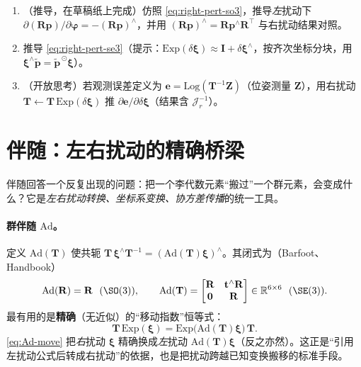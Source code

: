 \begin{practice}
\begin{enumerate}
  \item （推导，在草稿纸上完成）仿照 \cref{eq:right-pert-so3}，推导\emph{左}扰动下 $\partial(\mathbf{R}\mathbf{p})/\partial\boldsymbol{\varphi}=-(\mathbf{R}\mathbf{p})^\wedge$，并用 $(\mathbf{R}\mathbf{p})^\wedge=\mathbf{R}\mathbf{p}^\wedge\mathbf{R}^\top$ 与右扰动结果对照。
  \item 推导 \cref{eq:right-pert-se3}（提示：$\mathrm{Exp}(\delta\boldsymbol{\xi})\approx\mathbf{I}+\delta\boldsymbol{\xi}^\wedge$，按齐次坐标分块，用 $\boldsymbol{\xi}^\wedge\tilde{\mathbf{p}}=\tilde{\mathbf{p}}^{\,\odot}\boldsymbol{\xi}$）。
  \item （开放思考）若观测误差定义为 $\mathbf{e}=\mathrm{Log}(\mathbf{T}^{-1}\mathbf{Z})$（位姿测量 $\mathbf{Z}$），用右扰动 $\mathbf{T}\leftarrow\mathbf{T}\,\mathrm{Exp}(\delta\boldsymbol{\xi})$ 推 $\partial\mathbf{e}/\partial\delta\boldsymbol{\xi}$（结果含 $\boldsymbol{\mathcal{J}}_r^{-1}$）。
\end{enumerate}
\end{practice}

\section{伴随：左右扰动的精确桥梁}
\label{sec:adjoint}

伴随回答一个反复出现的问题：把一个李代数元素“搬过”一个群元素，会变成什么？它是\emph{左右扰动转换、坐标系变换、协方差传播}的统一工具。

\paragraph{群伴随 $\mathrm{Ad}$。}定义 $\mathrm{Ad}(\mathbf{T})$ 使共轭 $\mathbf{T}\,\boldsymbol{\xi}^\wedge\mathbf{T}^{-1}=(\mathrm{Ad}(\mathbf{T})\boldsymbol{\xi})^\wedge$。其闭式为（Barfoot\cite{barfoot2024state}、Handbook\cite{carlone2026handbook}）
\begin{equation}
  \mathrm{Ad}(\mathbf{R})=\mathbf{R}\ \ (\SO(3)),\qquad
  \mathrm{Ad}(\mathbf{T})=\begin{bmatrix}\mathbf{R}&\mathbf{t}^\wedge\mathbf{R}\\\mathbf{0}&\mathbf{R}\end{bmatrix}\in\mathbb{R}^{6\times6}\ \ (\SE(3)).
  \label{eq:Ad}
\end{equation}
最有用的是\textbf{精确}（无近似）的“移动指数”恒等式：
\begin{equation}
  \mathbf{T}\,\mathrm{Exp}(\boldsymbol{\xi})=\mathrm{Exp}\big(\mathrm{Ad}(\mathbf{T})\boldsymbol{\xi}\big)\,\mathbf{T}.
  \label{eq:Ad-move}
\end{equation}
\cref{eq:Ad-move} 把\emph{右}扰动 $\boldsymbol{\xi}$ 精确换成\emph{左}扰动 $\mathrm{Ad}(\mathbf{T})\boldsymbol{\xi}$（反之亦然）。这正是“引用左扰动公式后转成右扰动”的依据，也是把扰动跨越已知变换搬移的标准手段。

